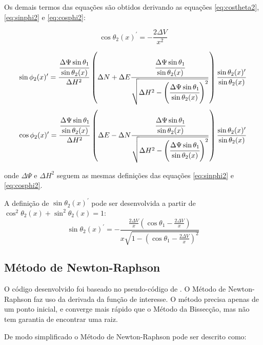 \documentclass[final,3p,12pt]{elsarticle}
\begin{document}
Os demais termos das equações são obtidos derivando as equações \ref{eq:costheta2}, \ref{eq:sinphi2} e \ref{eq:cosphi2}:

\begin{equation} \label{eq:costheta2prime}
    \cos \theta_2(x)^{\prime} = - \frac{2 \Delta V}{x^2} 
\end{equation}

\begin{equation} \label{eq:sinphi2prime}
    \sin \phi_2(x)^{\prime} = \frac{\cfrac{\Delta \Psi \sin \theta_1}{\sin \theta_2(x)}}{\Delta H^2} \left( \Delta N + \Delta E \frac{\cfrac{\Delta \Psi \sin \theta_1}{\sin \theta_2(x)} }{\sqrt{\Delta H^2 - \left( \cfrac{\Delta \Psi \sin \theta_1}{\sin \theta_2(x)} \right)^2}} \right) \frac{\sin \theta_2(x)^{\prime}}{\sin \theta_2(x)} 
\end{equation}
\begin{equation} \label{eq:cosphi2prime}
    \cos \phi_2(x)^{\prime} = \frac{\cfrac{\Delta \Psi \sin \theta_1}{\sin \theta_2(x)}}{\Delta H^2} \left( \Delta E - \Delta N \frac{\cfrac{\Delta \Psi \sin \theta_1}{\sin \theta_2(x)} }{\sqrt{\Delta H^2 - \left( \cfrac{\Delta \Psi \sin \theta_1}{\sin \theta_2(x)} \right)^2}} \right) \frac{\sin \theta_2(x)^{\prime}}{\sin \theta_2(x)} 
\end{equation}

onde $\Delta \Psi$ e $\Delta H^2$ seguem as mesmas definições das equações \ref{eq:sinphi2} e \ref{eq:cosphi2}.

A definição de $\sin \theta_2(x)^{\prime}$ pode ser desenvolvida a partir de $\cos^2 \theta_2(x) + \sin^2 \theta_2(x) = 1$:
\begin{equation} \label{eq:sintheta2prime}
    \sin \theta_2(x)^{\prime} = - \frac{\frac{2 \Delta V}{x}(\cos \theta_1 - \frac{2 \Delta V}{x})}{x \sqrt{1-\left(\cos \theta_1 - \frac{2 \Delta V}{x} \right)^2}}
\end{equation}

    \subsection{Método de Newton-Raphson}
    
    O código desenvolvido foi baseado no pseudo-código de \cite{burden2016analise}. O Método de Newton-Raphson faz uso da derivada da função de interesse. O método precisa apenas de um ponto inicial, e converge mais rápido que o Método da Bissecção, mas não tem garantia de encontrar uma raiz. 

    De modo simplificado o Método de Newton-Raphson pode ser descrito como:
    
\end{document}
